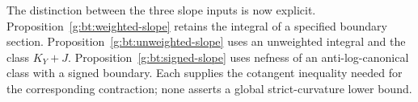 The distinction between the three slope inputs is now explicit.
Proposition~\ref{g:bt:weighted-slope} retains the integral of a specified
boundary section.  Proposition~\ref{g:bt:unweighted-slope} uses an
unweighted integral and the class $K_Y+J$.
Proposition~\ref{g:bt:signed-slope} uses nefness of an anti-log-canonical
class with a signed boundary.  Each supplies the cotangent inequality
needed for the corresponding contraction; none asserts a global
strict-curvature lower bound.
